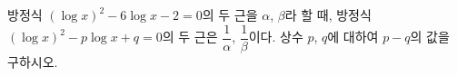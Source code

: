 방정식 $(\log x)^2-6\log x-2=0$의 두 근을 $\alpha$, $\beta$라 할 때, 방정식 $(\log x)^2-p\log x+q=0$의 두 근은 $\dfrac{1}{\alpha}$, $\dfrac{1}{\beta}$이다. 상수 $p$, $q$에 대하여 $p-q$의 값을 구하시오.

